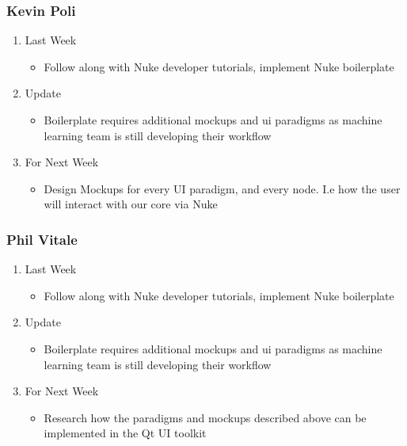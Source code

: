 \documentclass[15pt]{article}
\begin{document}
\subsubsection{Kevin Poli}
\label{sec:orgfe46f40}
\begin{enumerate}
\item Last Week
\label{sec:orga07182d}
\begin{itemize}
\item Follow along with Nuke developer tutorials, implement Nuke boilerplate
\end{itemize}
\item Update
\label{sec:orge8ca56b}
\begin{itemize}
\item Boilerplate requires additional mockups and ui paradigms as machine learning
team is still developing their workflow
\end{itemize}
\item For Next Week
\label{sec:orgc52e48f}
\begin{itemize}
\item Design Mockups for every UI paradigm, and every node. I.e how the user will
interact with our core via Nuke
\end{itemize}
\end{enumerate}
\subsubsection{Phil Vitale}
\label{sec:orgd947613}
\begin{enumerate}
\item Last Week
\label{sec:org04e1b6e}
\begin{itemize}
\item Follow along with Nuke developer tutorials, implement Nuke boilerplate
\end{itemize}
\item Update
\label{sec:orgc406f85}
\begin{itemize}
\item Boilerplate requires additional mockups and ui paradigms as machine learning
team is still developing their workflow
\end{itemize}
\item For Next Week
\label{sec:org45ebf18}
\begin{itemize}
\item Research how the paradigms and mockups described above can be implemented in
the Qt UI toolkit
\end{itemize}
\end{enumerate}
\end{document}
